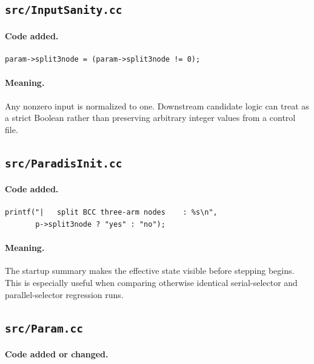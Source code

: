 \documentclass[11pt]{article}
\newcommand{\code}[1]{\texttt{\detokenize{#1}}}
\begin{document}
\subsection{\texttt{src/InputSanity.cc}}

\paragraph{Code added.}

\begin{lstlisting}[style=cpp]
param->split3node = (param->split3node != 0);
\end{lstlisting}

\paragraph{Meaning.}
Any nonzero input is normalized to one.  Downstream candidate logic can treat
\code{split3node} as a strict Boolean rather than preserving arbitrary
integer values from a control file.

\subsection{\texttt{src/ParadisInit.cc}}

\paragraph{Code added.}

\begin{lstlisting}[style=cpp]
printf("|   split BCC three-arm nodes    : %s\n",
       p->split3node ? "yes" : "no");
\end{lstlisting}

\paragraph{Meaning.}
The startup summary makes the effective state visible before stepping begins.
This is especially useful when comparing otherwise identical serial-selector
and parallel-selector regression runs.

\subsection{\texttt{src/Param.cc}}

\paragraph{Code added or changed.}
\end{document}
